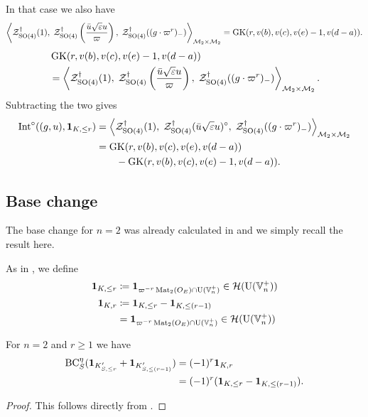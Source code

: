 In that case we also have
\ifthesis
\[
  \left< \mathcal Z^{\dagger}_{\operatorname{SO}(4)}(1), \;
    \mathcal Z^{\dagger}_{\operatorname{SO}(4)}\left(\frac{\bar u \sqrt{\varepsilon} u}{\varpi}\right), \;
    \mathcal Z^{\dagger}_{\operatorname{SO}(4)}((g \cdot \varpi^r)_-) \right>_{\mathcal M_2 \times \mathcal M_2}
    = \operatorname{GK}(r, v(b), v(c), v(e)-1, v(d-a)). \]
\fi
\ifpaper
\begin{align*}
  &\operatorname{GK}(r, v(b), v(c), v(e)-1, v(d-a)) \\
  &= \left< \mathcal Z^{\dagger}_{\operatorname{SO}(4)}(1), \;
    \mathcal Z^{\dagger}_{\operatorname{SO}(4)}\left(\frac{\bar u \sqrt{\varepsilon} u}{\varpi}\right), \;
    \mathcal Z^{\dagger}_{\operatorname{SO}(4)}((g \cdot \varpi^r)_-) \right>_{\mathcal M_2 \times \mathcal M_2}.
\end{align*}
\fi
Subtracting the two gives
\begin{equation}
  \begin{aligned}
    \operatorname{Int}^\circ((g,u), \mathbf{1}_{K, \le r}) &=
      \left< \mathcal Z^{\dagger}_{\operatorname{SO}(4)}(1), \;
        \mathcal Z^{\dagger}_{\operatorname{SO}(4)}(\bar u \sqrt{\varepsilon} u)^\circ, \;
        \mathcal Z^{\dagger}_{\operatorname{SO}(4)}((g \cdot \varpi^r)_-) \right>_{\mathcal M_2 \times \mathcal M_2} \\
    &= \operatorname{GK}(r, v(b), v(c), v(e), v(d-a)) \\
    &\qquad- \operatorname{GK}(r, v(b), v(c), v(e)-1, v(d-a)).
  \end{aligned}
  \label{eq:int_subtract}
\end{equation}

\subsection{Base change}
\label{sec:finale_base_change}
The base change for $n=2$ was already calculated in \cite{ref:AFLspherical}
and we simply recall the result here.

As in , we define
\begin{align*}
  \mathbf{1}_{K, \le r} &\coloneqq \mathbf{1}_{\varpi^{-r} \operatorname{Mat}_2(O_E) \cap \operatorname{U}(\mathbb V_n^+)} \in \mathcal H(\operatorname{U}(\mathbb V_n^+)) \\
  \mathbf{1}_{K, r} &\coloneqq \mathbf{1}_{K, \le r} - \mathbf{1}_{K, \le (r-1)} \\
  &= \mathbf{1}_{\varpi^{-r} \operatorname{Mat}_2(O_E) \cap \operatorname{U}(\mathbb V_n^+)} \in \mathcal H(\operatorname{U}(\mathbb V_n^+)) \\
\end{align*}

\begin{lemma}
  \label{lem:finale_base_change}
  For $n = 2$ and $r \ge 1$ we have
  \begin{align*}
    \operatorname{BC}_S^{\eta}(
      \mathbf{1}_{K'_{S, \le r}}
      + \mathbf{1}_{K'_{S, \le (r-1)}}
      )
      &= (-1)^r \mathbf{1}_{K, r} \\
      &= (-1)^r(\mathbf{1}_{K, \le r} - \mathbf{1}_{K, \le (r-1)}).
  \end{align*}
\end{lemma}
\begin{proof}
  This follows directly from \cite[Equation (7.1.9)]{ref:AFLspherical}.
\end{proof}

